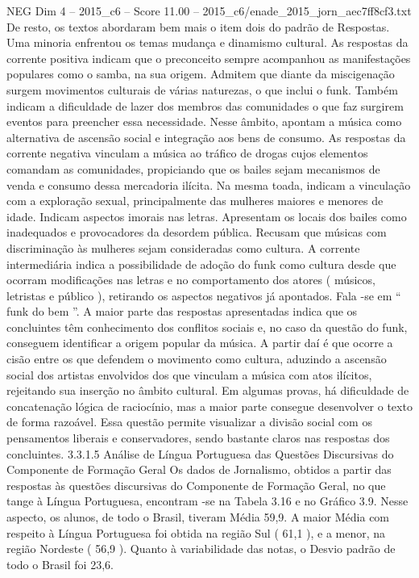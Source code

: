\begin{textsample}{NEG Dim 4 – 2015\_c6 – Score 11.00 – 2015\_c6/enade\_2015\_jorn\_aec7ff8cf3.txt}
De resto, os textos abordaram bem mais o item dois do padrão de Respostas.
Uma minoria enfrentou os temas mudança e dinamismo cultural.
As respostas da corrente positiva indicam que o preconceito sempre acompanhou as manifestações populares como o samba, na sua origem.
Admitem que diante da miscigenação surgem movimentos culturais de várias naturezas, o que inclui o funk.
Também indicam a dificuldade de lazer dos membros das comunidades o que faz surgirem eventos para preencher essa necessidade.
Nesse âmbito, apontam a música como alternativa de ascensão social e integração aos bens de consumo.
As respostas da corrente negativa vinculam a música ao tráfico de drogas cujos elementos comandam as comunidades, propiciando que os bailes sejam mecanismos de venda e consumo dessa mercadoria ilícita.
Na mesma toada, indicam a vinculação com a exploração sexual, principalmente das mulheres maiores e menores de idade.
Indicam aspectos imorais nas letras.
Apresentam os locais dos bailes como inadequados e provocadores da desordem pública.
Recusam que músicas com discriminação às mulheres sejam consideradas como cultura.
A corrente intermediária indica a possibilidade de adoção do funk como cultura desde que ocorram modificações nas letras e no comportamento dos atores ( músicos, letristas e público ), retirando os aspectos negativos já apontados.
Fala -se em “ funk do bem ”.
A maior parte das respostas apresentadas indica que os concluintes têm conhecimento dos conflitos sociais e, no caso da questão do funk, conseguem identificar a origem popular da música.
A partir daí é que ocorre a cisão entre os que defendem o movimento como cultura, aduzindo a ascensão social dos artistas envolvidos dos que vinculam a música com atos ilícitos, rejeitando sua inserção no âmbito cultural.
Em algumas provas, há dificuldade de concatenação lógica de raciocínio, mas a maior parte consegue desenvolver o texto de forma razoável.
Essa questão permite visualizar a divisão social com os pensamentos liberais e conservadores, sendo bastante claros nas respostas dos concluintes. 3.3.1.5 Análise de Língua Portuguesa das Questões Discursivas do Componente de Formação Geral Os dados de Jornalismo, obtidos a partir das respostas às questões discursivas do Componente de Formação Geral, no que tange à Língua Portuguesa, encontram -se na Tabela 3.16 e no Gráfico 3.9.
Nesse aspecto, os alunos, de todo o Brasil, tiveram Média 59,9.
A maior Média com respeito à Língua Portuguesa foi obtida na região Sul ( 61,1 ), e a menor, na região Nordeste ( 56,9 ).
Quanto à variabilidade das notas, o Desvio padrão de todo o Brasil foi 23,6.

\end{textsample}

